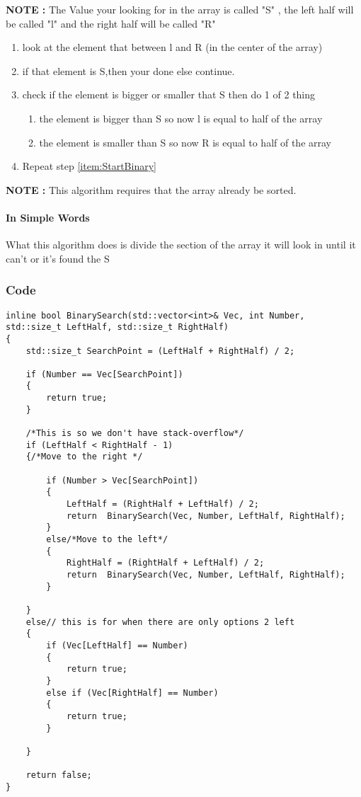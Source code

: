 \documentclass{article}
\begin{document}
\textbf{NOTE :} The Value your looking for in the array is called "S" , the left half will be called "l" and the right half will be called "R" 
\begin{enumerate}
\item look at the element that between l and R (in the center of the array) \label{item:StartBinary}
\item if that element is S,then your done else continue.
\item check if the element is bigger or smaller that S then do 1 of 2 thing 
\begin{enumerate}
\item the element is bigger than S so now l is equal to half of the array 
\item the element is smaller than S so now R is equal to half of the array 
\end{enumerate}
\item Repeat step \ref{item:StartBinary}
\end{enumerate}
\textbf{NOTE :} This algorithm requires that the array already be sorted.
\paragraph{In Simple Words} What this algorithm does is divide the section of the array it will look in until it can't or it's found the S 
\subsubsection{Code}
\begin{lstlisting}  
inline bool BinarySearch(std::vector<int>& Vec, int Number, std::size_t LeftHalf, std::size_t RightHalf)
{
	std::size_t SearchPoint = (LeftHalf + RightHalf) / 2;

	if (Number == Vec[SearchPoint])
	{
		return true;
	}

	/*This is so we don't have stack-overflow*/
	if (LeftHalf < RightHalf - 1)
	{/*Move to the right */

		if (Number > Vec[SearchPoint])
		{
			LeftHalf = (RightHalf + LeftHalf) / 2;
			return	BinarySearch(Vec, Number, LeftHalf, RightHalf);
		}
		else/*Move to the left*/
		{
			RightHalf = (RightHalf + LeftHalf) / 2;
			return	BinarySearch(Vec, Number, LeftHalf, RightHalf);
		}

	}
	else// this is for when there are only options 2 left
	{
		if (Vec[LeftHalf] == Number)
		{
			return true;
		}
		else if (Vec[RightHalf] == Number)
		{
			return true;
		}

	}

	return false;
}

\end{lstlisting} 
\end{document}
